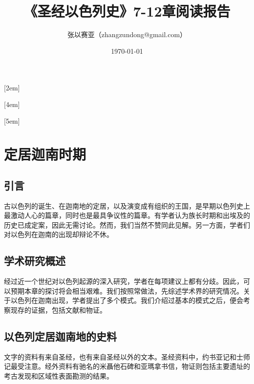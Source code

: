 \documentclass[12pt, a4paper]{ctexart}
\title{《圣经以色列史》7-12章阅读报告}
\author{张以赛亚（zhangzundong@gmail.com）}
\date{\today}
\begin{document}

\tableofcontents
{}[2em]{\songti}
{\contentslabel{2.5em}}{\hspace{-2.5em}}
{\titlerule*[0.5pt]{\hspace{-2.5em}}\thecontentspage}

[4em]{\songti}
{\contentslabel{2.5em}}{\hspace{-2.5em}}
{\titlerule*[0.5pt]{\hspace{-2.5em}}\thecontentspage}

[5em]{\songti}
{\contentslabel{1em}}{\hspace{-2.5em}}
{\titlerule*[0.5pt]{\hspace{-2.5em}}\thecontentspage}
\newpage
\setcounter{section}{6} %
\section{定居迦南时期}
\subsection{引言}
古以色列的诞生、在迦南地的定居，以及演变成有组织的王国，是早期以色列史上最激动人心的篇章，同时也是最具争议性的篇章。有学者认为族长时期和出埃及的历史已成定案，因此无需讨论。然而，我们当然不赞同此见解。另一方面，学者们对以色列在迦南的出现却辩论不休。

\subsection{学术研究概述}
经过近一个世纪对以色列起源的深入研究，学者在每项建议上都有分歧。因此，可以预期本章的探讨将会相当艰难。我们按照常做法，先综述学术界的研究情况。关于以色列在迦南出现，学者提出了多个模式。我们介绍过基本的模式之后，便会考察现存的证据，包括文献和物证。

\subsection{以色列定居迦南地的史料}
文字的资料有来自圣经，也有来自圣经以外的文本。圣经资料中，约书亚记和士师记最受注意。经外资料有驰名的米聶他石碑和亚瑪拿书信，物证则包括主要遗址的考古发现和区域性表面勘测的结果。
\end{document}
